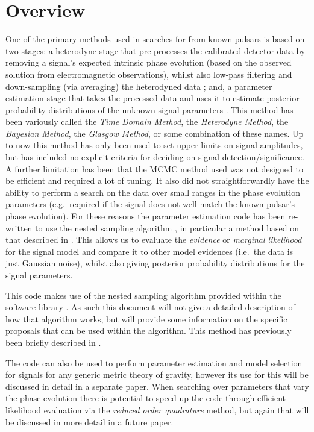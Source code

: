 \section{Overview}

One of the primary methods used in searches for \gws from known pulsars is based on two stages: a heterodyne
stage that pre-processes the calibrated \gw detector data by removing a signal's expected intrinsic phase
evolution (based on the observed solution from electromagnetic observations), whilst also low-pass filtering and
down-sampling (via averaging) the heterodyned data \citep{2005PhRvD..72j2002D}; and, a parameter estimation stage that takes the
processed data and uses it to estimate posterior probability distributions of the unknown signal parameters
\citep[e.g.\ using a Markov chain Monte Carlo (MCMC)][]{2010ApJ...713..671A}. This method has been variously
called the {\it Time Domain Method}, the {\it Heterodyne Method}, the {\it Bayesian Method}, the {\it Glasgow
Method}, or some combination of these names. Up to now this method has only been used to set upper limits
on signal amplitudes, but has included no explicit criteria for deciding on signal detection/significance. A further
limitation has been that the MCMC method used was not designed to be efficient and required a lot of tuning. It also
did not straightforwardly have the ability to perform a search on the data over small ranges in the phase
evolution parameters (e.g.\ required if the
\gw signal does not well match the known pulsar's phase evolution). For these reasons the parameter
estimation code has been re-written to use the nested sampling algorithm \cite{Skilling:2006}, in particular
a method based on that described in \citet{Veitch:2010}. This allows us to evaluate the {\it evidence} or {\it
marginal likelihood} for the signal model and compare it to other model evidences (i.e.\ the data is just
Gaussian noise), whilst also giving posterior probability distributions for the signal parameters.

This code makes use of the nested sampling algorithm provided within the \lalinf software library
\citep{2015PhRvD..91d2003V}. As such this document will not give a detailed description of how that algorithm
works, but will provide some information on the specific proposals that can be used within the algorithm.
This method has previously been briefly described in \citet{2012JPhCS.363a2041P}.

The code can also be used to perform parameter estimation and model selection for signals for any generic
metric theory of gravity, however its use for this will be discussed in detail in a separate paper. When
searching over parameters that vary the phase evolution there is potential to speed up the code through
efficient likelihood evaluation via the {\it reduced order quadrature} method, but again that will be
discussed in more detail in a future paper.

